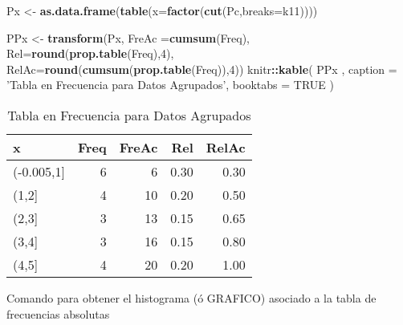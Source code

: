 \documentclass[
]{book}
\newenvironment{Shaded}{\begin{snugshade}}{\end{snugshade}}
\newcommand{\DataTypeTok}[1]{\textcolor[rgb]{0.13,0.29,0.53}{#1}}
\newcommand{\DecValTok}[1]{\textcolor[rgb]{0.00,0.00,0.81}{#1}}
\newcommand{\KeywordTok}[1]{\textcolor[rgb]{0.13,0.29,0.53}{\textbf{#1}}}
\newcommand{\NormalTok}[1]{#1}
\newcommand{\OperatorTok}[1]{\textcolor[rgb]{0.81,0.36,0.00}{\textbf{#1}}}
\newcommand{\OtherTok}[1]{\textcolor[rgb]{0.56,0.35,0.01}{#1}}
\newcommand{\StringTok}[1]{\textcolor[rgb]{0.31,0.60,0.02}{#1}}
\theoremstyle{definition}
\theoremstyle{definition}
\theoremstyle{definition}
\theoremstyle{definition}
\theoremstyle{remark}
\begin{document}
\begin{Shaded}
\begin{Highlighting}[]
\NormalTok{Px <-}\StringTok{ }\KeywordTok{as.data.frame}\NormalTok{(}\KeywordTok{table}\NormalTok{(}\DataTypeTok{x=}\KeywordTok{factor}\NormalTok{(}\KeywordTok{cut}\NormalTok{(Pc,}\DataTypeTok{breaks=}\NormalTok{k11))))}

\NormalTok{PPx <-}\StringTok{ }\KeywordTok{transform}\NormalTok{(Px,}
               \DataTypeTok{FreAc =}\KeywordTok{cumsum}\NormalTok{(Freq),}
               \DataTypeTok{Rel=}\KeywordTok{round}\NormalTok{(}\KeywordTok{prop.table}\NormalTok{(Freq),}\DecValTok{4}\NormalTok{),}
               \DataTypeTok{RelAc=}\KeywordTok{round}\NormalTok{(}\KeywordTok{cumsum}\NormalTok{(}\KeywordTok{prop.table}\NormalTok{(Freq)),}\DecValTok{4}\NormalTok{))}
\NormalTok{knitr}\OperatorTok{::}\KeywordTok{kable}\NormalTok{(}
\NormalTok{PPx , }\DataTypeTok{caption =} \StringTok{'Tabla en Frecuencia para Datos Agrupados'}\NormalTok{,}
  \DataTypeTok{booktabs =} \OtherTok{TRUE}
\NormalTok{)}
\end{Highlighting}
\end{Shaded}

\begin{table}

\caption{\label{tab:Tabla5}Tabla en Frecuencia para Datos Agrupados}
\centering
\begin{tabular}[t]{lrrrr}
\toprule
x & Freq & FreAc & Rel & RelAc\\
\midrule
(-0.005,1] & 6 & 6 & 0.30 & 0.30\\
(1,2] & 4 & 10 & 0.20 & 0.50\\
(2,3] & 3 & 13 & 0.15 & 0.65\\
(3,4] & 3 & 16 & 0.15 & 0.80\\
(4,5] & 4 & 20 & 0.20 & 1.00\\
\bottomrule
\end{tabular}
\end{table}

Comando para obtener el histograma (ó GRAFICO) asociado a la tabla de frecuencias absolutas
\end{document}
